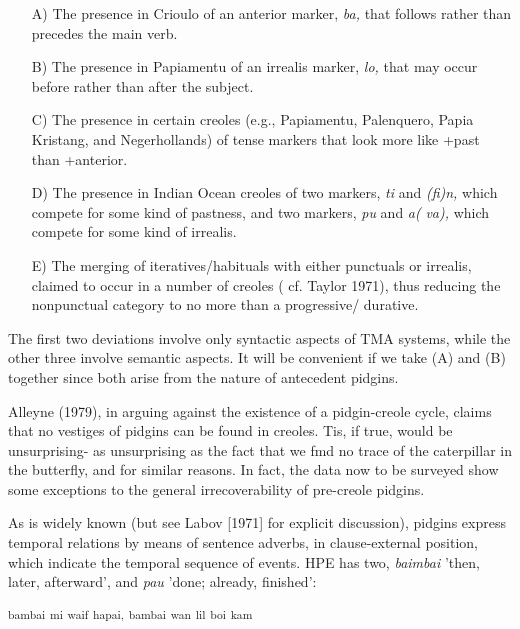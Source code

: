 \begin{itemize}
\item[A)] The presence in Crioulo of an anterior marker, \textit{ba,} that follows rather than precedes the main verb.
\item[B)] The presence in Papiamentu of an irrealis marker, \textit{lo,} that may occur before rather than after the subject.

\item[C)] The presence in certain creoles (e.g., Papiamentu, Palenquero, Papia Kristang, and Negerhollands) of tense markers that look more like +past than +anterior.

\item[D)] The presence in Indian Ocean creoles of two markers, \textit{ti} and
\textit{(}\textit{fi)n,} which compete for some kind of pastness, and two
markers, \textit{pu }and \textit{a(} \textit{va),} which compete for some kind of irrealis.
\item[E)] The merging of iteratives/habituals with either punctuals or irrealis, claimed to occur in a number of creoles ( cf. Taylor 1971), thus reducing the nonpunctual category to no more than a progressive/ durative.
\end{itemize}


The first two deviations involve only syntactic aspects of TMA systems, while the other three involve semantic aspects. It will be convenient if we take (A) and (B) together since both arise from the nature of antecedent pidgins.

Alleyne (1979), in arguing against the existence of a pidgin-creole cycle, claims that no vestiges of pidgins can be found in creoles. Tis, if true, would be unsurprising- as unsurprising as the fact that we fmd no trace of the caterpillar in the butterfly, and for similar reasons. In fact, the data now to be surveyed show some exceptions to the general irrecoverability of pre-creole pidgins.

As is widely known (but see Labov [1971] for explicit discussion), pidgins express temporal relations by means of sentence adverbs, in clause-external position, which indicate the temporal sequence of events. HPE has two, \textit{baimbai} 'then, later, afterward', and \textit{pau} 'done; already, finished':

\ea\label{ex:92}
 \textsuperscript{bambai} \textsuperscript{mi} \textsuperscript{waif} \textsuperscript{hapai,} \textsuperscript{bambai} \textsuperscript{wan} \textsuperscript{lil} \textsuperscript{boi} \textsuperscript{kam}
\glt
\z

